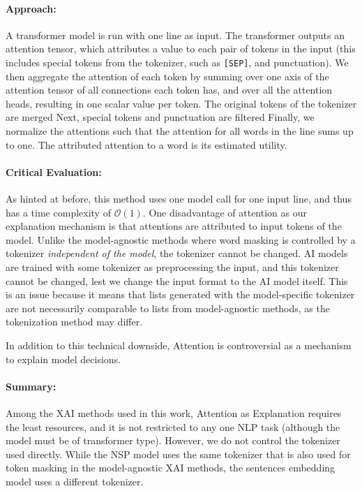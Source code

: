 \paragraph{Approach:}
A transformer model is run with one line as input.
The transformer outputs an attention tensor, which attributes a value to each pair of tokens in the input (this includes special tokens from the tokenizer, such as \texttt{[SEP]}, and punctuation).
We then aggregate the attention of each token by summing over one axis of the attention tensor of all connections each token has, and over all the attention heads, resulting in one scalar value per token.
The original tokens of the tokenizer are merged
Next, special tokens and punctuation are filtered
Finally, we normalize the attentions such that the attention for all words in the line sums up to one.
The attributed attention to a word is its estimated utility.

\paragraph{Critical Evaluation:}
As hinted at before, this method uses one model call for one input line, and thus has a time complexity of $\mathcal{O}(1)$.
One disadvantage of attention as our explanation mechanism is that attentions are attributed to input tokens of the model.
Unlike the model-agnostic methods where word masking is controlled by a tokenizer \textit{independent of the model}, the tokenizer cannot be changed.
AI models are trained with some tokenizer as preprocessing the input, and this tokenizer cannot be changed, lest we change the input format to the AI model itself.
This is an issue because it means that lists generated with the model-specific tokenizer are not necessarily comparable to lists from model-agnostic methods, as the tokenization method may differ.

In addition to this technical downside, Attention is controversial as a mechanism to explain model decisions.

\paragraph{Summary:}
Among the XAI methods used in this work, Attention as Explanation requires the least resources, and it is not restricted to any one NLP task (although the model must be of transformer type).
However, we do not control the tokenizer used directly.
While the NSP model uses the same tokenizer that is also used for token masking in the model-agnostic XAI methods, the sentences embedding model uses a different tokenizer.



